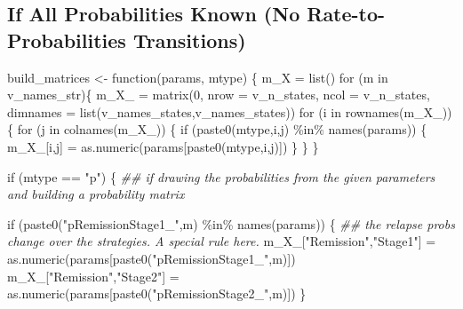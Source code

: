 \documentclass[
  letterpaper,
  DIV=11,
  numbers=noendperiod,
  oneside]{scrartcl}
\newenvironment{Shaded}{\begin{snugshade}}{\end{snugshade}}
\newcommand{\AttributeTok}[1]{\textcolor[rgb]{0.40,0.45,0.13}{#1}}
\newcommand{\ControlFlowTok}[1]{\textcolor[rgb]{0.00,0.23,0.31}{#1}}
\newcommand{\DecValTok}[1]{\textcolor[rgb]{0.68,0.00,0.00}{#1}}
\newcommand{\DocumentationTok}[1]{\textcolor[rgb]{0.37,0.37,0.37}{\textit{#1}}}
\newcommand{\FunctionTok}[1]{\textcolor[rgb]{0.28,0.35,0.67}{#1}}
\newcommand{\NormalTok}[1]{\textcolor[rgb]{0.00,0.23,0.31}{#1}}
\newcommand{\OtherTok}[1]{\textcolor[rgb]{0.00,0.23,0.31}{#1}}
\newcommand{\SpecialCharTok}[1]{\textcolor[rgb]{0.37,0.37,0.37}{#1}}
\newcommand{\StringTok}[1]{\textcolor[rgb]{0.13,0.47,0.30}{#1}}
\begin{document}
\hypertarget{if-all-probabilities-known-no-rate-to-probabilities-transitions}{%
\subsection{If All Probabilities Known (No Rate-to-Probabilities
Transitions)}\label{if-all-probabilities-known-no-rate-to-probabilities-transitions}}

\begin{Shaded}
\begin{Highlighting}[]
\NormalTok{build\_matrices }\OtherTok{\textless{}{-}} \ControlFlowTok{function}\NormalTok{(params, mtype) \{}
\NormalTok{  m\_X }\OtherTok{=} \FunctionTok{list}\NormalTok{()}
  \ControlFlowTok{for}\NormalTok{ (m }\ControlFlowTok{in}\NormalTok{ v\_names\_str)\{}
\NormalTok{    m\_X\_ }\OtherTok{=} \FunctionTok{matrix}\NormalTok{(}\DecValTok{0}\NormalTok{, }\AttributeTok{nrow =}\NormalTok{ v\_n\_states, }\AttributeTok{ncol =}\NormalTok{ v\_n\_states, }\AttributeTok{dimnames =} \FunctionTok{list}\NormalTok{(v\_names\_states,v\_names\_states))}
    \ControlFlowTok{for}\NormalTok{ (i }\ControlFlowTok{in} \FunctionTok{rownames}\NormalTok{(m\_X\_)) \{}
      \ControlFlowTok{for}\NormalTok{ (j }\ControlFlowTok{in} \FunctionTok{colnames}\NormalTok{(m\_X\_)) \{}
        \ControlFlowTok{if}\NormalTok{ (}\FunctionTok{paste0}\NormalTok{(mtype,i,j) }\SpecialCharTok{\%in\%} \FunctionTok{names}\NormalTok{(params)) \{}
\NormalTok{          m\_X\_[i,j] }\OtherTok{=} \FunctionTok{as.numeric}\NormalTok{(params[}\FunctionTok{paste0}\NormalTok{(mtype,i,j)])}
\NormalTok{        \}}
\NormalTok{      \}}
\NormalTok{    \}}
    
    \ControlFlowTok{if}\NormalTok{ (mtype }\SpecialCharTok{==} \StringTok{"p"}\NormalTok{) \{}
      \DocumentationTok{\#\# if drawing the probabilities from the given parameters and building a probability matrix}
      
      \ControlFlowTok{if}\NormalTok{ (}\FunctionTok{paste0}\NormalTok{(}\StringTok{"pRemissionStage1\_"}\NormalTok{,m) }\SpecialCharTok{\%in\%} \FunctionTok{names}\NormalTok{(params)) \{}
        \DocumentationTok{\#\# the relapse probs change over the strategies. A special rule here. }
\NormalTok{        m\_X\_[}\StringTok{"Remission"}\NormalTok{,}\StringTok{"Stage1"}\NormalTok{] }\OtherTok{=} \FunctionTok{as.numeric}\NormalTok{(params[}\FunctionTok{paste0}\NormalTok{(}\StringTok{"pRemissionStage1\_"}\NormalTok{,m)])}
\NormalTok{        m\_X\_[}\StringTok{"Remission"}\NormalTok{,}\StringTok{"Stage2"}\NormalTok{] }\OtherTok{=} \FunctionTok{as.numeric}\NormalTok{(params[}\FunctionTok{paste0}\NormalTok{(}\StringTok{"pRemissionStage2\_"}\NormalTok{,m)])}
\NormalTok{      \}}
        

\end{Highlighting}
\end{Shaded}
\end{document}
